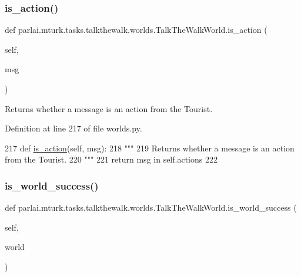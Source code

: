 \subsubsection{\texorpdfstring{is\+\_\+action()}{is\_action()}}
{\footnotesize\ttfamily def parlai.\+mturk.\+tasks.\+talkthewalk.\+worlds.\+Talk\+The\+Walk\+World.\+is\+\_\+action (\begin{DoxyParamCaption}\item[{}]{self,  }\item[{}]{msg }\end{DoxyParamCaption})}

\begin{DoxyVerb}Returns whether a message is an action from the Tourist.
\end{DoxyVerb}
 

Definition at line 217 of file worlds.\+py.


\begin{DoxyCode}
217     \textcolor{keyword}{def }\hyperlink{namespaceparlai_1_1tasks_1_1talkthewalk_1_1worlds_aa28536df060005c301225d766f91cb13}{is\_action}(self, msg):
218         \textcolor{stringliteral}{"""}
219 \textcolor{stringliteral}{        Returns whether a message is an action from the Tourist.}
220 \textcolor{stringliteral}{        """}
221         \textcolor{keywordflow}{return} msg \textcolor{keywordflow}{in} self.actions
222 
\end{DoxyCode}
\mbox{\label{classparlai_1_1mturk_1_1tasks_1_1talkthewalk_1_1worlds_1_1TalkTheWalkWorld_ae43f66ea3849c1b8015132e53d1a617b}} 
\subsubsection{\texorpdfstring{is\+\_\+world\+\_\+success()}{is\_world\_success()}}
{\footnotesize\ttfamily def parlai.\+mturk.\+tasks.\+talkthewalk.\+worlds.\+Talk\+The\+Walk\+World.\+is\+\_\+world\+\_\+success (\begin{DoxyParamCaption}\item[{}]{self,  }\item[{}]{world }\end{DoxyParamCaption})}

